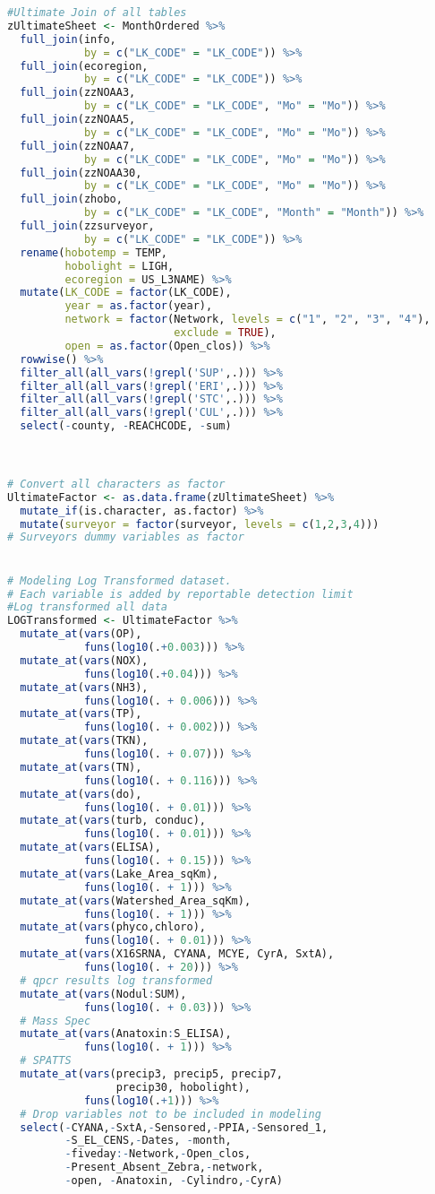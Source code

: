 \begin{lstlisting}[language=R, basicstyle=\small\ttfamily]
#Ultimate Join of all tables
zUltimateSheet <- MonthOrdered %>%
  full_join(info,
            by = c("LK_CODE" = "LK_CODE")) %>%
  full_join(ecoregion,
            by = c("LK_CODE" = "LK_CODE")) %>%
  full_join(zzNOAA3,
            by = c("LK_CODE" = "LK_CODE", "Mo" = "Mo")) %>%
  full_join(zzNOAA5,
            by = c("LK_CODE" = "LK_CODE", "Mo" = "Mo")) %>%
  full_join(zzNOAA7,
            by = c("LK_CODE" = "LK_CODE", "Mo" = "Mo")) %>%
  full_join(zzNOAA30,
            by = c("LK_CODE" = "LK_CODE", "Mo" = "Mo")) %>%
  full_join(zhobo,
            by = c("LK_CODE" = "LK_CODE", "Month" = "Month")) %>%
  full_join(zzsurveyor,
            by = c("LK_CODE" = "LK_CODE")) %>%
  rename(hobotemp = TEMP,
         hobolight = LIGH,
         ecoregion = US_L3NAME) %>%
  mutate(LK_CODE = factor(LK_CODE),
         year = as.factor(year),
         network = factor(Network, levels = c("1", "2", "3", "4"),
                          exclude = TRUE),
         open = as.factor(Open_clos)) %>%
  rowwise() %>%
  filter_all(all_vars(!grepl('SUP',.))) %>%
  filter_all(all_vars(!grepl('ERI',.))) %>%
  filter_all(all_vars(!grepl('STC',.))) %>%
  filter_all(all_vars(!grepl('CUL',.))) %>%
  select(-county, -REACHCODE, -sum)



# Convert all characters as factor
UltimateFactor <- as.data.frame(zUltimateSheet) %>%
  mutate_if(is.character, as.factor) %>%
  mutate(surveyor = factor(surveyor, levels = c(1,2,3,4)))
# Surveyors dummy variables as factor


# Modeling Log Transformed dataset.
# Each variable is added by reportable detection limit
#Log transformed all data
LOGTransformed <- UltimateFactor %>%
  mutate_at(vars(OP),
            funs(log10(.+0.003))) %>%
  mutate_at(vars(NOX),
            funs(log10(.+0.04))) %>%
  mutate_at(vars(NH3),
            funs(log10(. + 0.006))) %>%
  mutate_at(vars(TP),
            funs(log10(. + 0.002))) %>%
  mutate_at(vars(TKN),
            funs(log10(. + 0.07))) %>%
  mutate_at(vars(TN),
            funs(log10(. + 0.116))) %>%
  mutate_at(vars(do),
            funs(log10(. + 0.01))) %>%
  mutate_at(vars(turb, conduc),
            funs(log10(. + 0.01))) %>%
  mutate_at(vars(ELISA),
            funs(log10(. + 0.15))) %>%
  mutate_at(vars(Lake_Area_sqKm),
            funs(log10(. + 1))) %>%
  mutate_at(vars(Watershed_Area_sqKm),
            funs(log10(. + 1))) %>%
  mutate_at(vars(phyco,chloro),
            funs(log10(. + 0.01))) %>%
  mutate_at(vars(X16SRNA, CYANA, MCYE, CyrA, SxtA),
            funs(log10(. + 20))) %>%
  # qpcr results log transformed
  mutate_at(vars(Nodul:SUM),
            funs(log10(. + 0.03))) %>%
  # Mass Spec
  mutate_at(vars(Anatoxin:S_ELISA),
            funs(log10(. + 1))) %>%
  # SPATTS
  mutate_at(vars(precip3, precip5, precip7,
                 precip30, hobolight),
            funs(log10(.+1))) %>%
  # Drop variables not to be included in modeling
  select(-CYANA,-SxtA,-Sensored,-PPIA,-Sensored_1,
         -S_EL_CENS,-Dates, -month,
         -fiveday:-Network,-Open_clos,
         -Present_Absent_Zebra,-network,
         -open, -Anatoxin, -Cylindro,-CyrA)



\end{lstlisting}
